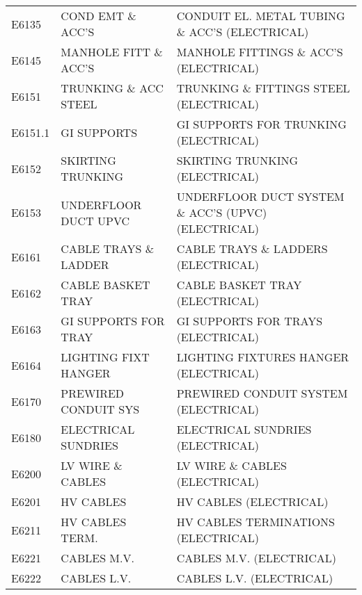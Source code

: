 \begin{longtable}[l]{l%
                  l|%
                  l|}
\rowcolor{thetableheadbgcolor!0.25!white} E6135       & COND EMT \& ACC'S   & CONDUIT EL. METAL TUBING \& ACC'S (ELECTRICAL)   \\
\rowcolor{thetableheadbgcolor!0.25!white} E6145       & MANHOLE FITT \& ACC'S   & MANHOLE FITTINGS \& ACC'S (ELECTRICAL)   \\
\rowcolor{thetableheadbgcolor!0.25!white} E6151       & TRUNKING \& ACC STEEL   & TRUNKING \& FITTINGS STEEL (ELECTRICAL)   \\
\rowcolor{thetableheadbgcolor!0.25!white} E6151.1     & GI SUPPORTS   & GI SUPPORTS FOR TRUNKING (ELECTRICAL)   \\
\rowcolor{thetableheadbgcolor!0.25!white} E6152       & SKIRTING TRUNKING   & SKIRTING TRUNKING (ELECTRICAL)   \\
\rowcolor{thetableheadbgcolor!0.25!white} E6153       & UNDERFLOOR DUCT UPVC   & UNDERFLOOR DUCT SYSTEM \& ACC'S (UPVC) (ELECTRICAL)   \\
\rowcolor{thetableheadbgcolor!0.25!white} E6161       & CABLE TRAYS \& LADDER   & CABLE TRAYS \& LADDERS (ELECTRICAL)   \\
\rowcolor{thetableheadbgcolor!0.25!white} E6162       & CABLE BASKET TRAY   & CABLE BASKET TRAY (ELECTRICAL)   \\
\rowcolor{thetableheadbgcolor!0.25!white} E6163       & GI SUPPORTS FOR TRAY   & GI SUPPORTS FOR TRAYS (ELECTRICAL)   \\
\rowcolor{thetableheadbgcolor!0.25!white} E6164       & LIGHTING FIXT HANGER   & LIGHTING FIXTURES HANGER (ELECTRICAL)   \\
\rowcolor{thetableheadbgcolor!0.25!white} E6170       & PREWIRED CONDUIT SYS   & PREWIRED CONDUIT SYSTEM (ELECTRICAL)   \\
\rowcolor{thetableheadbgcolor!0.25!white} E6180       & ELECTRICAL SUNDRIES   & ELECTRICAL SUNDRIES (ELECTRICAL)   \\
\rowcolor{thetableheadbgcolor!0.25!white} E6200       & LV WIRE \& CABLES   & LV WIRE \& CABLES (ELECTRICAL)   \\
\rowcolor{thetableheadbgcolor!0.25!white} E6201       & HV CABLES   & HV CABLES (ELECTRICAL)   \\
\rowcolor{thetableheadbgcolor!0.25!white} E6211       & HV CABLES TERM.   & HV CABLES TERMINATIONS (ELECTRICAL)   \\
\rowcolor{thetableheadbgcolor!0.25!white} E6221       & CABLES M.V.   & CABLES M.V. (ELECTRICAL)   \\
\rowcolor{thetableheadbgcolor!0.25!white} E6222       & CABLES L.V.   & CABLES L.V. (ELECTRICAL)   \\

\end{longtable}
